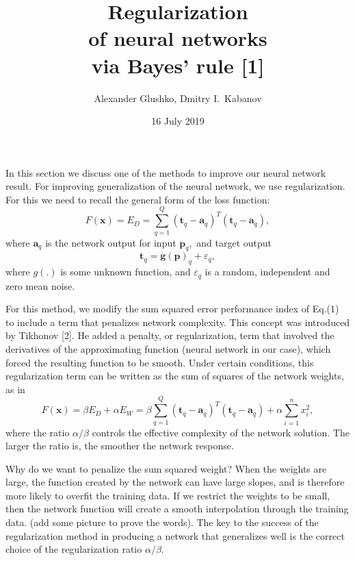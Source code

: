 \documentclass[a4paper, 12pt, english, parskip]{scrartcl}
\title{\vspace{-0.5cm}Regularization\\of neural networks\\via Bayes' rule [1]}
\author{Alexander Glushko, Dmitry I.\ Kabanov}
\date{16 July 2019}
\begin{document}
\maketitle

In this section we discuss one of the methods to improve our neural network result.
For improving generalization of the neural network, we use regularization. For this we need to recall the general form of the loss function: 
\begin{equation}
F(\boldsymbol{x}) = E_D = \sum_{q = 1}^Q (\boldsymbol{t}_q - \boldsymbol{a}_q)^T(\boldsymbol{t}_q - \boldsymbol{a}_q),
\end{equation}
where $\boldsymbol{a}_q$ is the network output for input $\boldsymbol{p}_q,$ and target output 
\begin{equation}
\boldsymbol{t}_q = \boldsymbol{g(p)}_q + \varepsilon_q,
\end{equation}
where $g(.)$ is some unknown function, and $\varepsilon_q$ is a random, independent and zero mean noise.

For this method, we modify the sum squared error performance index of Eq.(1) to include a term that penalizes network complexity. This concept was introduced by Tikhonov [2]. He added a penalty, or regularization, term that involved the derivatives of the approximating function (neural network in our case), which forced the resulting function to be smooth. Under certain conditions, this regularization term can be written as the sum of squares of the network weights, as in
\begin{equation}
F(\boldsymbol{x}) = \beta E_D + \alpha E_W = \beta \sum_{q = 1}^Q (\boldsymbol{t}_q - \boldsymbol{a}_q)^T(\boldsymbol{t}_q - \boldsymbol{a}_q) + \alpha \sum_{i = 1}^n x_i^2,
\end{equation}
where the ratio $\alpha / \beta$ controls the effective complexity of the network solution. The larger the ratio is, the smoother the network response.

Why do we want to penalize the sum squared weight? When the
weights are large, the function created by the network can have large slopes, and is therefore more likely to overfit the training data. If we restrict the weights to be small, then the network function will create a smooth interpolation through the training data. (add some picture to prove the words). The key to the success of the regularization method in producing a network that generalizes well is the correct choice of the regularization ratio $\alpha / \beta $.
\end{document}
